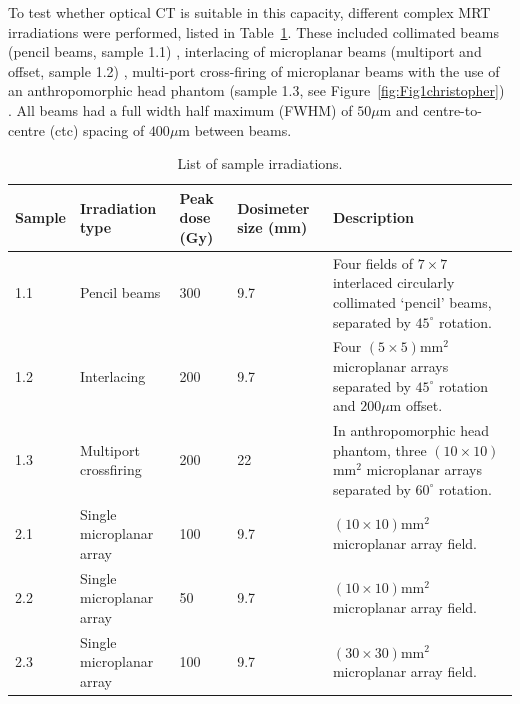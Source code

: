 \documentclass[12pt]{article}
\begin{document}
To test whether optical CT is suitable in this capacity, different complex MRT irradiations were performed, listed in Table~\ref{table:samples}. These included collimated beams (pencil beams, sample 1.1) \cite{brauer-krischeffects2010}, interlacing of microplanar beams (multiport and offset, sample 1.2) \cite{serduchigh-precision2010}, multi-port cross-firing of microplanar beams with the use of an anthropomorphic head phantom (sample 1.3, see Figure~\ref{fig:Fig1christopher}) \cite{requardt2005new}. All beams had a full width half maximum (FWHM) of $50\mu$m and centre-to-centre (ctc) spacing of $400\mu$m between beams.

\begin{table}[H]
	\centering
	\begin{tabular}{ p{1.4cm} | p{3cm} |p{1cm} | p{2cm} |p{6.5cm}  }
		\textbf{Sample} & \textbf{Irradiation type} &\textbf{Peak dose (Gy)}   &\textbf{Dosimeter size (mm)} & \textbf{Description} \\ \hline
		1.1  & Pencil beams & 300  & 9.7 & Four fields of $7\times 7$ interlaced circularly collimated `pencil' beams, separated by  $45^{\circ}$ rotation. \\ \hline
		1.2  & Interlacing & 200  & 9.7 & Four $(5\times 5)$mm$^2$ microplanar arrays separated by $45^{\circ}$ rotation and $200\mu $m offset. \\ \hline
		1.3  & Multiport crossfiring & 200  & 22 & In anthropomorphic head phantom, three $(10\times 10)$mm$^2$ microplanar arrays separated by $60^{\circ}$ rotation. \\ \hline
		2.1  & Single microplanar array & 100  & 9.7 & $(10\times 10)$mm$^2$ microplanar array field. \\ \hline
		2.2  & Single microplanar array & 50  & 9.7 & $(10\times 10)$mm$^2$ microplanar array field. \\ \hline
		2.3  & Single microplanar array & 100  & 9.7 & $(30\times 30)$mm$^2$ microplanar array field. \\ %
	\end{tabular}
		\caption{List of sample irradiations.}
		\label{table:samples}
	\end{table}
\end{document}
